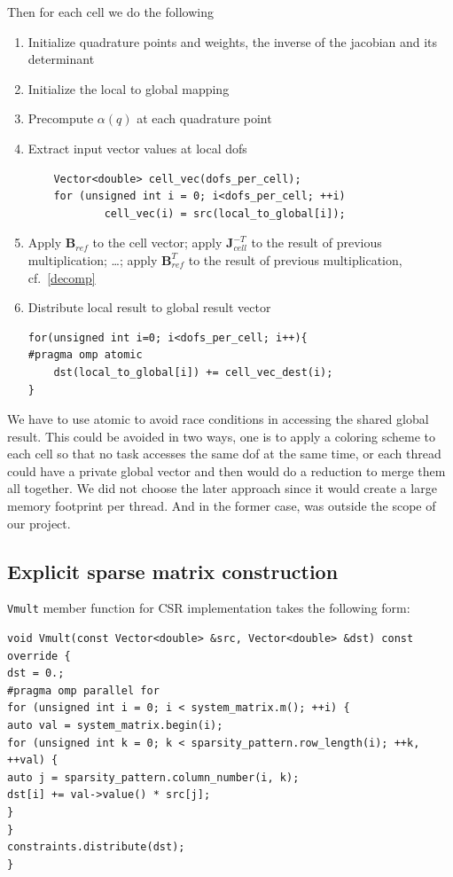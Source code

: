 \documentclass[12pt]{article}
\newcommand{\vect}[1]{\boldsymbol{\mathbf{#1}}}
\begin{document}
Then for each cell we do the following
\begin{enumerate}
\item Initialize quadrature points and weights, the inverse of the jacobian and its determinant
\item Initialize the local to global mapping
\item Precompute $\alpha(q)$ at each quadrature point
\item Extract input vector values at local dofs
\begin{lstlisting}
	Vector<double> cell_vec(dofs_per_cell);
	for (unsigned int i = 0; i<dofs_per_cell; ++i)
			cell_vec(i) = src(local_to_global[i]);
\end{lstlisting}
\item Apply $\vect B_{ref}$ to the cell vector; apply $\vect J^{-T}_{cell}$ to the result of previous multiplication; \dots ; apply $\vect B^{T}_{ref}$ to the result of previous multiplication, cf.~\eqref{decomp}
\item Distribute local result to global result vector
\begin{lstlisting}
for(unsigned int i=0; i<dofs_per_cell; i++){
#pragma omp atomic
	dst(local_to_global[i]) += cell_vec_dest(i);
}
\end{lstlisting}
\end{enumerate}
We have to use atomic to avoid race conditions in accessing the shared global result. This could be avoided in two ways, one is to apply a coloring scheme to each cell so that no task accesses the same dof at the same time, or each thread could have a private global vector and then would do a reduction to merge them all together. We did not choose the later approach since it would create a large memory footprint per thread. And in the former case, was outside the scope of our project.

\subsection{Explicit sparse matrix construction}

\texttt{Vmult} member function for CSR implementation takes the following form: 
\begin{lstlisting}[caption={CSR matrix multiplication with row-wise parallelization},captionpos=b]
void Vmult(const Vector<double> &src, Vector<double> &dst) const override {
dst = 0.;
#pragma omp parallel for
for (unsigned int i = 0; i < system_matrix.m(); ++i) {
auto val = system_matrix.begin(i);
for (unsigned int k = 0; k < sparsity_pattern.row_length(i); ++k, ++val) {
auto j = sparsity_pattern.column_number(i, k);
dst[i] += val->value() * src[j];
}
}
constraints.distribute(dst);
}
\end{lstlisting}
\end{document}
